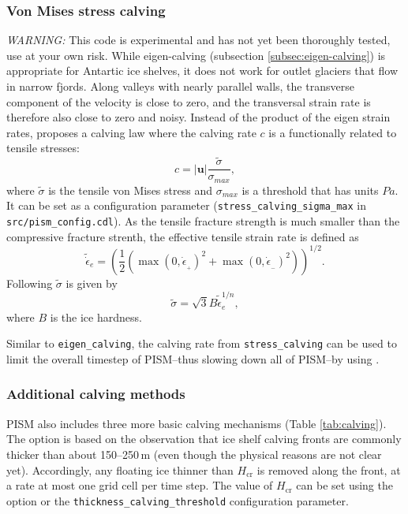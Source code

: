 \subsubsection{Von Mises stress calving}
\label{subsec:stress-calving}

\emph{WARNING:} This code is experimental and has not yet been thoroughly tested, use at your own risk. While eigen-calving (subsection \ref{subsec:eigen-calving}) is appropriate for Antartic ice shelves, it does not work for outlet glaciers that flow in narrow  fjords. Along valleys with nearly parallel walls, the transverse component of the velocity is close to zero, and the transversal strain rate is therefore also close to zero and noisy. Instead of the product of the eigen strain rates, \cite{Morlighem2016} proposes a calving law where the calving rate $c$ is a functionally related to tensile stresses:
\begin{equation}
\label{eq: calv3}
c = |\mathbf{u}| \frac{\tilde{\sigma}}{\sigma_{max}},
\end{equation}
where $\tilde{\sigma}$ is the tensile von Mises stress and $\sigma_{max}$ is a threshold that has units $Pa$. It can be set as a configuration parameter (\texttt{stress_calving_sigma_max} in \texttt{src/pism_config.cdl}). As the tensile fracture strength is much smaller than the compressive fracture strenth, the effective tensile strain rate is defined as 
\begin{equation}
\label{eq: calv4}
\tilde{\dot{\epsilon}}_e = \left(\frac{1}{2}\left(\max(0,\dot{\epsilon}_{_+})^2 + \max(0,\dot{\epsilon}_{_-})^2\right)\right)^{1/2}.
\end{equation}
Following \cite{Morlighem2016} $\tilde{\sigma}$ is given by
\begin{equation}
\label{eq: calv5}
\tilde{\sigma} = \sqrt{3} B \tilde{\dot{{\epsilon}}}_e^{1/n},
\end{equation}
where $B$ is the ice hardness.

Similar to \texttt{eigen_calving}, the calving rate from \texttt{stress_calving} can be used to limit the overall timestep of PISM--thus slowing down all of PISM--by using .

\subsubsection{Additional calving methods}
\label{subsec:additional-calving}


PISM also includes three more basic calving mechanisms (Table \ref{tab:calving}). The option  is based on the observation that ice shelf calving fronts are commonly thicker than about 150--250\,m (even though the physical reasons are not clear yet). Accordingly, any floating ice thinner than $H_{\textrm{cr}}$ is removed along the front, at a rate at most one grid cell per time step. The value of $H_{\mathrm{cr}}$ can be set using the  option or the \texttt{thickness_calving_threshold} configuration parameter.

